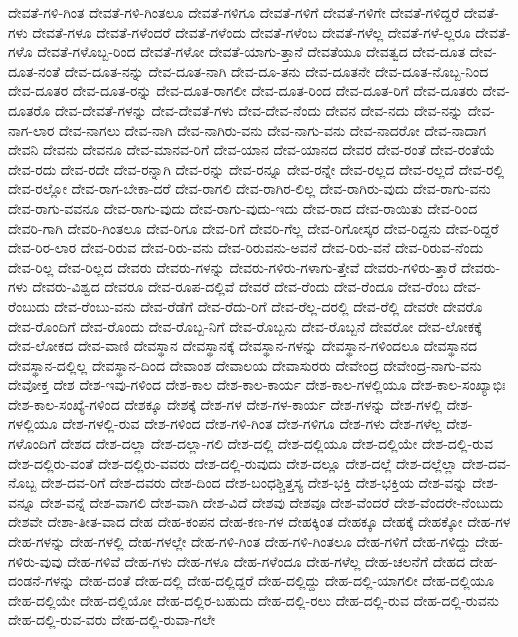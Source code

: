 {ದೇವತೆ-ಗಳಿ-ಗಿಂತ
ದೇವತೆ-ಗಳಿ-ಗಿಂತಲೂ
ದೇವತೆ-ಗಳಿಗೂ
ದೇವತೆ-ಗಳಿಗೆ
ದೇವತೆ-ಗಳಿಗೇ
ದೇವತೆ-ಗಳಿದ್ದರೆ
ದೇವತೆ-ಗಳು
ದೇವತೆ-ಗಳೂ
ದೇವತೆ-ಗಳೆಂದರೆ
ದೇವತೆ-ಗಳೆಂದು
ದೇವತೆ-ಗಳೆಂಬ
ದೇವತೆ-ಗಳೆಲ್ಲ
ದೇವತೆ-ಗಳೆ-ಲ್ಲರೂ
ದೇವತೆ-ಗಳೊ
ದೇವತೆ-ಗಳೊಬ್ಬ-ರಿಂದ
ದೇವತೆ-ಗಳೋ
ದೇವತೆ-ಯಾಗು-ತ್ತಾನೆ
ದೇವತೆಯೂ
ದೇವತ್ವದ
ದೇವ-ದೂತ
ದೇವ-ದೂತ-ನಂತೆ
ದೇವ-ದೂತ-ನನ್ನು
ದೇವ-ದೂತ-ನಾಗಿ
ದೇವ-ದೂ-ತನು
ದೇವ-ದೂತನೇ
ದೇವ-ದೂತ-ನೊಬ್ಬ-ನಿಂದ
ದೇವ-ದೂತರ
ದೇವ-ದೂತ-ರನ್ನು
ದೇವ-ದೂತ-ರಾಗಲೀ
ದೇವ-ದೂತ-ರಿಂದ
ದೇವ-ದೂತ-ರಿಗೆ
ದೇವ-ದೂತರು
ದೇವ-ದೂತರೊ
ದೇವ-ದೇವತೆ-ಗಳನ್ನು
ದೇವ-ದೇವತೆ-ಗಳು
ದೇವ-ದೇವ-ನೆಂದು
ದೇವನ
ದೇವ-ನದು
ದೇವ-ನನ್ನು
ದೇವ-ನಾಗ-ಲಾರ
ದೇವ-ನಾಗಲು
ದೇವ-ನಾಗಿ
ದೇವ-ನಾಗಿರು-ವನು
ದೇವ-ನಾಗು-ವನು
ದೇವ-ನಾದರೋ
ದೇವ-ನಾದಾಗ
ದೇವನಿ
ದೇವನು
ದೇವನೂ
ದೇವ-ಮಾನವ-ರಿಗೆ
ದೇವ-ಯಾನ
ದೇವ-ಯಾನದ
ದೇವರ
ದೇವ-ರಂತೆ
ದೇವ-ರಂತೆಯೆ
ದೇವ-ರದು
ದೇವ-ರದೇ
ದೇವ-ರನ್ನಾಗಿ
ದೇವ-ರನ್ನು
ದೇವ-ರನ್ನೂ
ದೇವ-ರನ್ನೇ
ದೇವ-ರಲ್ಲದ
ದೇವ-ರಲ್ಲದೆ
ದೇವ-ರಲ್ಲಿ
ದೇವ-ರಲ್ಲೋ
ದೇವ-ರಾಗ-ಬೇಕಾ-ದರೆ
ದೇವ-ರಾಗಲಿ
ದೇವ-ರಾಗಿರ-ಲಿಲ್ಲ
ದೇವ-ರಾಗಿರು-ವುದು
ದೇವ-ರಾಗು-ವನು
ದೇವ-ರಾಗು-ವವನೂ
ದೇವ-ರಾಗು-ವುದು
ದೇವ-ರಾಗು-ವುದು-ಇದು
ದೇವ-ರಾದ
ದೇವ-ರಾಯಿತು
ದೇವ-ರಿಂದ
ದೇವರಿ-ಗಾಗಿ
ದೇವರಿ-ಗಿಂತಲೂ
ದೇವ-ರಿಗೂ
ದೇವ-ರಿಗೆ
ದೇವರಿ-ಗೆಲ್ಲ
ದೇವ-ರಿಗೋಸ್ಕರ
ದೇವ-ರಿದ್ದನು
ದೇವ-ರಿದ್ದರೆ
ದೇವ-ರಿರ-ಲಾರ
ದೇವ-ರಿರುವ
ದೇವ-ರಿರು-ವನು
ದೇವ-ರಿರುವನು-ಅವನೆ
ದೇವ-ರಿರು-ವನೆ
ದೇವ-ರಿರುವ-ನೆಂದು
ದೇವ-ರಿಲ್ಲ
ದೇವ-ರಿಲ್ಲದ
ದೇವರು
ದೇವರು-ಗಳನ್ನು
ದೇವರು-ಗಳಿರು-ಗಳಾಗು-ತ್ತೇವೆ
ದೇವರು-ಗಳಿರು-ತ್ತಾರೆ
ದೇವರು-ಗಳು
ದೇವರು-ವಿಶ್ವದ
ದೇವರೂ
ದೇವ-ರೂಪ-ದಲ್ಲಿವೆ
ದೇವರೆ
ದೇವ-ರೆಂದು
ದೇವ-ರೆಂದೂ
ದೇವ-ರೆಂಬ
ದೇವ-ರೆಂಬುದು
ದೇವ-ರೆಂಬು-ವನು
ದೇವ-ರೆಡೆಗೆ
ದೇವ-ರೆದು-ರಿಗೆ
ದೇವ-ರೆಲ್ಲ-ದರಲ್ಲಿ
ದೇವ-ರೆಲ್ಲಿ
ದೇವರೇ
ದೇವರೊ
ದೇವ-ರೊಂದಿಗೆ
ದೇವ-ರೊಂದು
ದೇವ-ರೊಬ್ಬ-ನಿಗೆ
ದೇವ-ರೊಬ್ಬನು
ದೇವ-ರೊಬ್ಬನೆ
ದೇವರೋ
ದೇವ-ಲೋಕಕ್ಕೆ
ದೇವ-ಲೋಕದ
ದೇವ-ವಾಣಿ
ದೇವಸ್ಥಾನ
ದೇವಸ್ಥಾನಕ್ಕೆ
ದೇವಸ್ಥಾನ-ಗಳನ್ನು
ದೇವಸ್ಥಾನ-ಗಳಿಂದಲೂ
ದೇವಸ್ಥಾನದ
ದೇವಸ್ಥಾನ-ದಲ್ಲಿಲ್ಲ
ದೇವಸ್ಥಾನ-ದಿಂದ
ದೇವಾಂಶ
ದೇವಾಲಯ
ದೇವಾಸುರರು
ದೇವೇಂದ್ರ
ದೇವೇಂದ್ರ-ನಾಗು-ವನು
ದೇವೋಕ್ತ
ದೇಶ
ದೇಶ-ಇವು-ಗಳಿಂದ
ದೇಶ-ಕಾಲ
ದೇಶ-ಕಾಲ-ಕಾರ್ಯ
ದೇಶ-ಕಾಲ-ಗಳಲ್ಲಿಯೂ
ದೇಶ-ಕಾಲ-ಸಂಖ್ಯಾಭಿಃ
ದೇಶ-ಕಾಲ-ಸಂಖ್ಯೆ-ಗಳಿಂದ
ದೇಶಕ್ಕೂ
ದೇಶಕ್ಕೆ
ದೇಶ-ಗಳ
ದೇಶ-ಗಳ-ಕಾರ್ಯ
ದೇಶ-ಗಳನ್ನು
ದೇಶ-ಗಳಲ್ಲಿ
ದೇಶ-ಗಳಲ್ಲಿಯೂ
ದೇಶ-ಗಳಲ್ಲಿ-ರುವ
ದೇಶ-ಗಳಿಂದ
ದೇಶ-ಗಳಿ-ಗಿಂತ
ದೇಶ-ಗಳಿಗೂ
ದೇಶ-ಗಳು
ದೇಶ-ಗಳೆಲ್ಲ
ದೇಶ-ಗಳೊಂದಿಗೆ
ದೇಶದ
ದೇಶ-ದಲ್ಲಾ
ದೇಶ-ದಲ್ಲಾ-ಗಲಿ
ದೇಶ-ದಲ್ಲಿ
ದೇಶ-ದಲ್ಲಿಯೂ
ದೇಶ-ದಲ್ಲಿಯೇ
ದೇಶ-ದಲ್ಲಿ-ರುವ
ದೇಶ-ದಲ್ಲಿರು-ವಂತೆ
ದೇಶ-ದಲ್ಲಿರು-ವವರು
ದೇಶ-ದಲ್ಲಿ-ರುವುದು
ದೇಶ-ದಲ್ಲೂ
ದೇಶ-ದಲ್ಲೆ
ದೇಶ-ದಲ್ಲೆಲ್ಲಾ
ದೇಶ-ದವ-ನೊಬ್ಬ
ದೇಶ-ದವ-ರಿಗೆ
ದೇಶ-ದವರು
ದೇಶ-ದಿಂದ
ದೇಶ-ಬಂಧಶ್ಚಿತ್ತಸ್ಯ
ದೇಶ-ಭಕ್ತಿ
ದೇಶ-ಭಕ್ತಿಯ
ದೇಶ-ವನ್ನು
ದೇಶ-ವನ್ನೂ
ದೇಶ-ವನ್ನೆ
ದೇಶ-ವಾಗಲಿ
ದೇಶ-ವಾಗಿ
ದೇಶ-ವಿದೆ
ದೇಶವು
ದೇಶವೂ
ದೇಶ-ವೆಂದರೆ
ದೇಶ-ವೆಂದರೇ-ನೆಂಬುದು
ದೇಶವೇ
ದೇಶಾ-ತೀತ-ವಾದ
ದೇಹ
ದೇಹ-ಕಂಪನ
ದೇಹ-ಕಣ-ಗಳ
ದೇಹಕ್ಕಿಂತ
ದೇಹಕ್ಕೂ
ದೇಹಕ್ಕೆ
ದೇಹಕ್ಕೋ
ದೇಹ-ಗಳ
ದೇಹ-ಗಳನ್ನು
ದೇಹ-ಗಳಲ್ಲಿ
ದೇಹ-ಗಳಲ್ಲೇ
ದೇಹ-ಗಳಿ-ಗಿಂತ
ದೇಹ-ಗಳಿ-ಗಿಂತಲೂ
ದೇಹ-ಗಳಿಗೆ
ದೇಹ-ಗಳಿದ್ದು
ದೇಹ-ಗಳಿರು-ವುವು
ದೇಹ-ಗಳಿವೆ
ದೇಹ-ಗಳು
ದೇಹ-ಗಳೂ
ದೇಹ-ಗಳೆಂದೂ
ದೇಹ-ಗಳೆಲ್ಲ
ದೇಹ-ಚಲನೆಗೆ
ದೇಹದ
ದೇಹ-ದಂಡನೆ-ಗಳನ್ನು
ದೇಹ-ದಂತೆ
ದೇಹ-ದಲ್ಲಿ
ದೇಹ-ದಲ್ಲಿದ್ದರೆ
ದೇಹ-ದಲ್ಲಿದ್ದು
ದೇಹ-ದಲ್ಲಿ-ಯಾಗಲೀ
ದೇಹ-ದಲ್ಲಿಯೂ
ದೇಹ-ದಲ್ಲಿಯೇ
ದೇಹ-ದಲ್ಲಿಯೋ
ದೇಹ-ದಲ್ಲಿರ-ಬಹುದು
ದೇಹ-ದಲ್ಲಿ-ರಲು
ದೇಹ-ದಲ್ಲಿ-ರುವ
ದೇಹ-ದಲ್ಲಿ-ರುವನು
ದೇಹ-ದಲ್ಲಿ-ರುವ-ವರು
ದೇಹ-ದಲ್ಲಿ-ರುವಾ-ಗಲೇ
}
